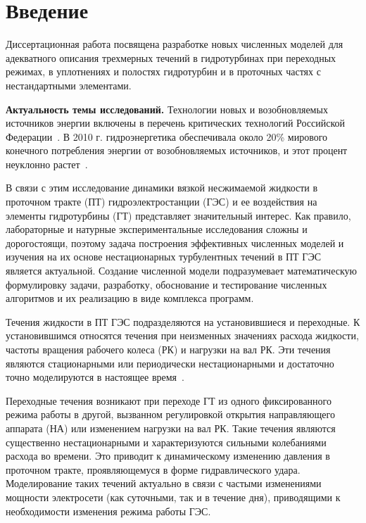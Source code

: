 \chapter*{Введение}
%
\setcounter{section}{0}

Диссертационная работа посвящена разработке новых численных моделей для адекватного описания трехмерных 
течений в гидротурбинах при переходных режимах, в уплотнениях и полостях гидротурбин и в проточных частях с 
нестандартными элементами.

\textbf{Актуальность темы исследований.} 
Технологии новых и возобновляемых источников энергии включены в перечень критических технологий 
Российской Федерации~\cite{prt_RF}. В 2010 г. гидроэнергетика обеспечивала около 20\% мирового конечного 
потребления энергии от возобновляемых источников, и этот процент неуклонно растет~\cite{GSR_12}.

В связи с этим исследование динамики вязкой несжимаемой жидкости в проточном тракте (ПТ) 
гидроэлектростанции (ГЭС) и ее воздействия на элементы гидротурбины (ГТ) представляет значительный интерес. 
Как правило, лабораторные и натурные экспериментальные исследования сложны и дорогостоящи, поэтому задача 
построения эффективных численных моделей и изучения на их основе нестационарных турбулентных течений в ПТ ГЭС
является актуальной. Создание численной модели подразумевает математическую формулировку задачи, 
разработку, обоснование и тестирование численных алгоритмов и их реализацию в виде комплекса программ.

Течения жидкости в ПТ ГЭС подразделяются на установившиеся и переходные.
К установившимся относятся течения при неизменных значениях расхода жидкости, частоты
вращения рабочего колеса (РК) и нагрузки на вал РК. Эти течения являются стационарными или
периодически нестационарными и достаточно точно моделируются в настоящее 
время~\cite{Cher,Rupr,Vunen1,Smir,Kuro}.

Переходные течения возникают при переходе ГТ из одного фиксированного режима работы в другой, 
вызванном регулировкой открытия направляющего аппарата (НА) или изменением нагрузки на вал РК. 
Такие течения являются существенно нестационарными и характеризуются сильными колебаниями расхода во 
времени. Это приводит к динамическому изменению давления в проточном тракте, проявляющемуся в форме 
гидравлического удара. Моделирование таких течений актуально в связи с частыми изменениями
мощности электросети (как суточными, так и в течение дня), приводящими к необходимости 
изменения режима работы ГЭС. 

